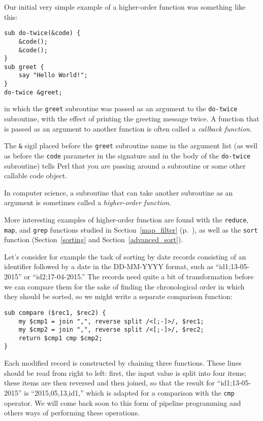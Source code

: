 Our initial very simple example of a higher-order function 
was something like this:

\begin{verbatim}
sub do-twice(&code) {
    &code(); 
    &code();
}
sub greet {
    say "Hello World!";
}
do-twice &greet;
\end{verbatim}

in which the {\tt greet} subroutine was passed as an 
argument to the {\tt do-twice} subroutine, with the 
effect of printing the greeting message twice. A 
function that is passed as an argument to another function 
is often called a \emph{callback function}.

The \verb"&" sigil placed before the {\tt greet} 
subroutine name in the argument list (as well as before 
the {\tt code} parameter in the signature and in the 
body of the {\tt do-twice} subroutine) tells Perl 
that you are passing around a subroutine or some 
other callable code object.
\ifplastex \else
{}
\fi

In computer science, a subroutine that can take 
another subroutine as an argument is sometimes 
called a \emph{higher-order function}.

More interesting examples of higher-order function 
are found with the {\tt reduce}, {\tt map}, and
{\tt grep} functions studied in Section~\ref{map_filter} 
(p.~\pageref{map_filter}), as well as the {\tt sort} 
function (Section~\ref{sorting} and Section~\ref{advanced_sort}).

Let's consider for example the task of sorting by date 
records consisting of an identifier followed by a date 
in the DD-MM-YYYY format, such as ``id1;13-05-2015'' 
or ``id2;17-04-2015.'' The records need quite a bit of 
transformation before we can compare them for the sake 
of finding the chronological order in which they should 
be sorted, so we might write a separate comparison 
function:

\begin{verbatim}
sub compare ($rec1, $rec2) {
    my $cmp1 = join ",", reverse split /<[;-]>/, $rec1;
    my $cmp2 = join ",", reverse split /<[;-]>/, $rec2;
    return $cmp1 cmp $cmp2;
}   
\end{verbatim}

Each modified record is constructed by chaining three 
functions. These lines should be read from right to left: 
first, the input value is split into four items; these 
items are then reversed and then joined, so that the result 
for ``id1;13-05-2015'' is ``2015,05,13,id1,'' which is 
adapted for a comparison with the {\tt cmp} operator. We 
will come back soon to this form of pipeline programming 
and others ways of performing these operations. 

